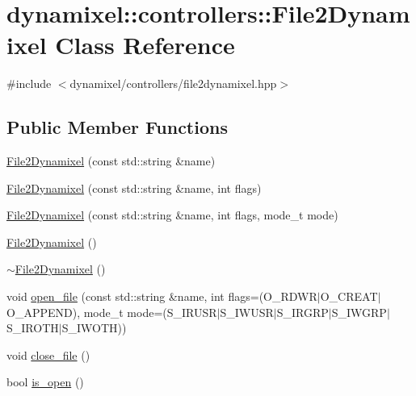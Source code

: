 \hypertarget{classdynamixel_1_1controllers_1_1_file2_dynamixel}{}\section{dynamixel\+:\+:controllers\+:\+:File2\+Dynamixel Class Reference}
\label{classdynamixel_1_1controllers_1_1_file2_dynamixel}


{\ttfamily \#include $<$dynamixel/controllers/file2dynamixel.\+hpp$>$}

\subsection*{Public Member Functions}
\begin{DoxyCompactItemize}
\item 
\hyperlink{classdynamixel_1_1controllers_1_1_file2_dynamixel_a9ff507ed75ea792e2fefa4bbb3b71145}{File2\+Dynamixel} (const std\+::string \&name)
\item 
\hyperlink{classdynamixel_1_1controllers_1_1_file2_dynamixel_adc49cde6130371a242f99d09b924fa31}{File2\+Dynamixel} (const std\+::string \&name, int flags)
\item 
\hyperlink{classdynamixel_1_1controllers_1_1_file2_dynamixel_a405baa0d39511e927743c426c6993d76}{File2\+Dynamixel} (const std\+::string \&name, int flags, mode\+\_\+t mode)
\item 
\hyperlink{classdynamixel_1_1controllers_1_1_file2_dynamixel_a10e6303a5e4d76415072f83c8048e865}{File2\+Dynamixel} ()
\item 
\hyperlink{classdynamixel_1_1controllers_1_1_file2_dynamixel_a0b96fae42238a5c4c727df0eca5f363f}{$\sim$\+File2\+Dynamixel} ()
\item 
void \hyperlink{classdynamixel_1_1controllers_1_1_file2_dynamixel_a1e68d04cdaf13238b6c8cfed0a5ddcf4}{open\+\_\+file} (const std\+::string \&name, int flags=(O\+\_\+\+R\+D\+W\+R$\vert$O\+\_\+\+C\+R\+E\+A\+T$\vert$O\+\_\+\+A\+P\+P\+E\+N\+D), mode\+\_\+t mode=(S\+\_\+\+I\+R\+U\+S\+R$\vert$S\+\_\+\+I\+W\+U\+S\+R$\vert$S\+\_\+\+I\+R\+G\+R\+P$\vert$S\+\_\+\+I\+W\+G\+R\+P$\vert$S\+\_\+\+I\+R\+O\+T\+H$\vert$S\+\_\+\+I\+W\+O\+T\+H))
\item 
void \hyperlink{classdynamixel_1_1controllers_1_1_file2_dynamixel_a52e59b1b366fea5e23672bdd6c424769}{close\+\_\+file} ()
\item 
bool \hyperlink{classdynamixel_1_1controllers_1_1_file2_dynamixel_a6786062337b8089f25f5d7899d18a000}{is\+\_\+open} ()

\end{DoxyCompactItemize}
